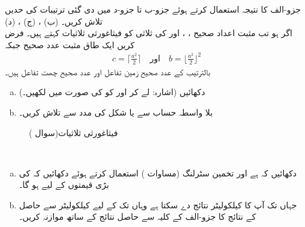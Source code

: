 جزو-الف کا نتیجہ استعمال کرتے ہوئے جزو-ب تا جزو-د میں دی گئی  ترتیبات کی حدیں تلاش کریں۔ (ب) ، (ج) ، (د) 
\\
اگر  ہو تب مثبت اعداد صحیح  ،  ، اور   کی ثلاثی  کو فیثاغورثی ثلاثیات  کہتے ہیں۔ فرض کریں  ایک طاق مثبت عدد صحیح  جبکہ
\begin{align*}
c=\lceil\tfrac{a^2}{2}\rceil\quad \text{اور}\quad b=\lfloor\tfrac{a^2}{2}\rfloor^2
\end{align*}
بالترتیب  کے عدد صحیح زمین تفاعل  اور عدد صحیح چھت تفاعل ہیں۔
\begin{enumerate}[a.]
\item
دکھائیں  (اشارہ:   لے کر  اور  کو  کی صورت میں لکھیں۔)
\item
بلا واسطہ حساب سے یا شکل  کی مدد سے  تلاش کریں۔
\end{enumerate}
\begin{figure}
\centering
{}
\caption{فیثاغورثی ثلاثیات(سوال )}
\label{شکل_سوال_ترکیب_فیثاغورث_جوڑی}
\end{figure}
\\
\begin{enumerate}[a.]
\item
دکھائیں کہ  ہے اور  تخمین سٹرلنگ (مساوات ) استعمال کرتے ہوئے دکھائیں کہ  کی بڑی قیمتوں کے لیے   ہو گا۔
\item
جہاں تک آپ کا کیلکولیٹر نتائج دے سکتا ہے وہاں تک  کے لیے کیلکولیٹر سے حاصل  کے نتائج کا جزو-الف کے کلیہ سے حاصل نتائج کے ساتھ موازنہ کریں۔ 
\end{enumerate}
